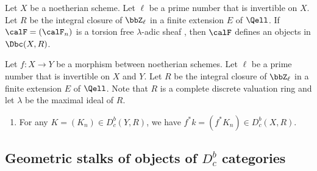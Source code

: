 \begin{remark}
    Let $X$ be a noetherian scheme. Let $\ell$ be a prime number that is invertible on $X$. Let $R$ be the integral closure of $\bbZ_\ell$ in a finite extension $E$ of $\Qell$.
    If $\calF = (\calF_n)$ is a torsion free $\lambda$-adic sheaf , then $\calF$ defines an objects in $\Dbc(X,R)$. 
\end{remark}



\begin{proposition}
    Let $f: X \to Y$ be a morphism between noetherian schemes. Let $\ell$ be a prime number that is invertible on $X$ and $Y$. Let $R$ be the integral closure of $\bbZ_\ell$ in a finite extension $E$ of $\Qell$. Note that $R$ is a complete discrete valuation ring and let $\lambda$ be the maximal ideal of $R$.
    \begin{enumerate}
        \item For any $K = (K_n) \in D_c^b(Y,R)$, we have $f^*k = (f^*K_n) \in D_c^b(X,R)$.
    \end{enumerate}
\end{proposition}







\subsection{Geometric stalks of objects of $D_c^b$ categories}





